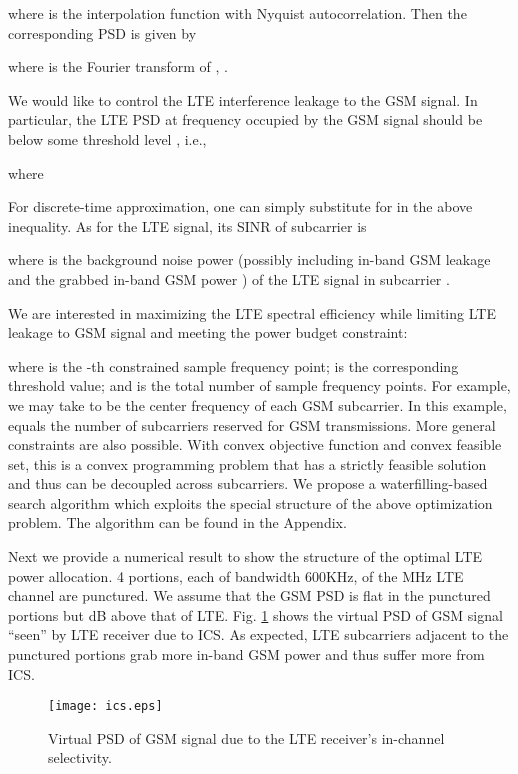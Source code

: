 \documentclass[10pt,journal]{IEEEtran}
\theoremstyle{slplain}
\begin{document}
where  is the interpolation function with Nyquist autocorrelation. Then the corresponding PSD is given by

where  is the Fourier transform of , .


We would like to control the LTE interference leakage to the GSM signal. In particular, the LTE PSD at frequency  occupied by the GSM signal should be below some threshold level , i.e.,

where

For discrete-time approximation, one can simply substitute  for  in the above inequality.
As for the LTE signal, its SINR of subcarrier  is

where  is the background noise power (possibly including in-band GSM leakage and the grabbed in-band GSM power ) of the LTE signal in subcarrier .

We are interested in maximizing the LTE spectral efficiency while limiting LTE leakage to GSM signal and meeting the power budget constraint:

where  is the -th constrained sample frequency point;  is the corresponding threshold value; and  is the total number of sample frequency points. For example, we may take  to be the center frequency of each GSM subcarrier. In this example,  equals the number of subcarriers reserved for GSM transmissions. More general constraints are also possible. With convex objective function and convex feasible set, this is a convex programming problem that has a strictly feasible solution and thus can be decoupled across subcarriers. We propose a waterfilling-based search algorithm which exploits the special structure of the above optimization problem. The algorithm can be found in the Appendix.





Next we provide a numerical result to show the structure of the optimal LTE power allocation. 4 portions, each of bandwidth 600KHz, of the MHz LTE channel are punctured. We assume that the GSM PSD is flat in the punctured portions but    dB above that of LTE. Fig. \ref{fig:12} shows the virtual PSD of GSM signal ``seen'' by LTE receiver due to ICS. As expected, LTE subcarriers adjacent  to the punctured portions grab more in-band GSM power and thus suffer more from ICS.


\begin{figure}
\centering
\texttt{[image: ics.eps]}
\caption{Virtual PSD of GSM signal due to the LTE receiver's in-channel selectivity.}
\label{fig:12}
\end{figure}
\end{document}
